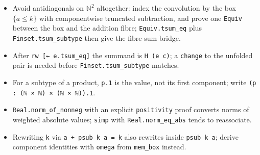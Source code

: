 \documentclass[11pt]{article}
\begin{document}
\begin{itemize}
\item Avoid antidiagonals on $\mathbb N^2$ altogether: index the convolution by the box
$\{a\le k\}$ with componentwise truncated subtraction, and prove one \texttt{Equiv} between the
box and the addition fibre; \texttt{Equiv.tsum\_eq} plus \texttt{Finset.tsum\_subtype} then give the
fibre-sum bridge.
\item After \texttt{rw [← e.tsum\_eq]} the summand is \texttt{H (e c)}; a \texttt{change} to the
unfolded pair is needed before \texttt{Finset.tsum\_subtype} matches.
\item For a subtype of a product, \texttt{p.1} is the value, not its first component; write
\texttt{(p : (ℕ × ℕ) × (ℕ × ℕ)).1}.
\item \texttt{Real.norm\_of\_nonneg} with an explicit \texttt{positivity} proof converts norms of
weighted absolute values; \texttt{simp} with \texttt{Real.norm\_eq\_abs} tends to reassociate.
\item Rewriting \texttt{k} via \texttt{a + psub k a = k} also rewrites inside \texttt{psub k a};
derive component identities with \texttt{omega} from \texttt{mem\_box} instead.
\end{itemize}
\end{document}
